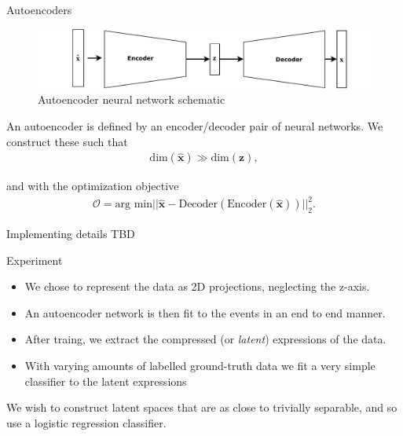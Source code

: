 \documentclass{beamer}
\begin{document}
\begin{frame}[t]{Autoencoders}
	\begin{figure}[h]
		\centering
		\includegraphics[width=0.8\linewidth]{../chapters/theory/autoencoder/plots/autoencoder.pdf}
		\caption{Autoencoder neural network schematic}%
		\label{fig:autoenc}
	\end{figure}

	An autoencoder is defined by an encoder/decoder pair of neural networks. We construct these such that 
	\begin{align}
		\text{dim}(\mathbf{\hat{x}}) \gg \text{dim}(\mathbf{z}),
	\end{align}

	and with the optimization objective
	\begin{align}
		\mathcal{O} = \text{arg min} || \mathbf{\hat{x}} - \text{Decoder}(\text{Encoder}(\mathbf{\hat{x}}))||_2 ^2.
	\end{align}
\end{frame}

\begin{frame}[t]{Implementing details}
	TBD
\end{frame}

\begin{frame}[t]{Experiment}
	\begin{itemize}
		\item We chose to represent the data as 2D projections, neglecting the z-axis.
		\item An autoencoder network is then fit to the events in an end to end manner.
		\item After traing, we extract the compressed (or \textit{latent}) expressions of the data.
		\item With varying amounts of labelled ground-truth data we fit a very simple classifier to the latent expressions
	\end{itemize}
	We wish to construct latent spaces that are as close to trivially separable, and so use a logistic regression classifier.
\end{frame}
\end{document}
